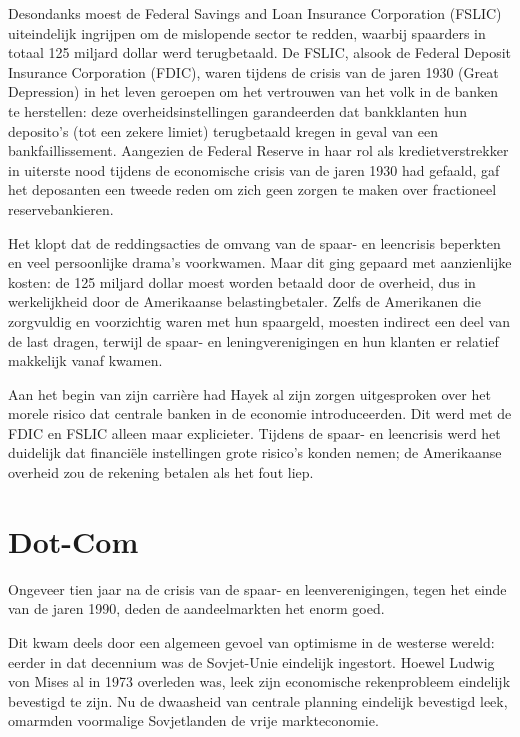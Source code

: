 \documentclass[smalldemyvopaper,11pt,twoside,onecolumn,openright,extrafontsizes,hidelinks]{memoir}
\begin{document}
Desondanks moest de Federal Savings and Loan Insurance Corporation
(FSLIC) uiteindelijk ingrijpen om de mislopende sector te redden,
waarbij spaarders in totaal 125 miljard dollar werd terugbetaald. De
FSLIC, alsook de Federal Deposit Insurance Corporation (FDIC), waren
tijdens de crisis van de jaren 1930 (Great Depression) in het leven
geroepen om het vertrouwen van het volk in de banken te herstellen: deze
overheidsinstellingen garandeerden dat bankklanten hun deposito's (tot
een zekere limiet) terugbetaald kregen in geval van een
bankfaillissement. Aangezien de Federal Reserve in haar rol als
kredietverstrekker in uiterste nood tijdens de economische crisis van de
jaren 1930 had gefaald, gaf het deposanten een tweede reden om zich geen
zorgen te maken over fractioneel reservebankieren.

Het klopt dat de reddingsacties de omvang van de spaar- en leencrisis
beperkten en veel persoonlijke drama's voorkwamen. Maar dit ging gepaard
met aanzienlijke kosten: de 125 miljard dollar moest worden betaald door
de overheid, dus in werkelijkheid door de Amerikaanse belastingbetaler.
Zelfs de Amerikanen die zorgvuldig en voorzichtig waren met hun
spaargeld, moesten indirect een deel van de last dragen, terwijl de
spaar- en leningverenigingen en hun klanten er relatief makkelijk vanaf
kwamen.

Aan het begin van zijn carrière had Hayek al zijn zorgen uitgesproken
over het morele risico dat centrale banken in de economie
introduceerden. Dit werd met de FDIC en FSLIC alleen maar explicieter.
Tijdens de spaar- en leencrisis werd het duidelijk dat financiële
instellingen grote risico's konden nemen; de Amerikaanse overheid zou de
rekening betalen als het fout liep.

\section{Dot-Com}\label{dot-com}

Ongeveer tien jaar na de crisis van de spaar- en leenverenigingen, tegen
het einde van de jaren 1990, deden de aandeelmarkten het enorm goed.

Dit kwam deels door een algemeen gevoel van optimisme in de westerse
wereld: eerder in dat decennium was de Sovjet-Unie eindelijk ingestort.
Hoewel Ludwig von Mises al in 1973 overleden was, leek zijn economische
rekenprobleem eindelijk bevestigd te zijn. Nu de dwaasheid van centrale
planning eindelijk bevestigd leek, omarmden voormalige Sovjetlanden de
vrije markteconomie.
\end{document}
